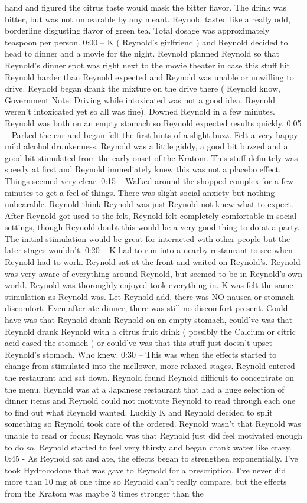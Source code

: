 \documentclass[12pt]{book}
\begin{document}
hand and figured the citrus taste would mask the bitter flavor. The drink was bitter, but was not unbearable by any meant. Reynold tasted like a really odd, borderline disgusting flavor of green tea. Total dosage was approximately  teaspoon per person. 0:00 -- K ( Reynold's girlfriend ) and Reynold decided to head to dinner and a movie for the night. Reynold planned Reynold so that Reynold's dinner spot was right next to the movie theater in case this stuff hit Reynold harder than Reynold expected and Reynold was unable or unwilling to drive. Reynold began drank the mixture on the drive there ( Reynold know, Government Note: Driving while intoxicated was not a good idea. Reynold weren't intoxicated yet so all was fine). Downed Reynold in a few minutes. Reynold was both on an empty stomach so Reynold expected results quickly. 0:05 -- Parked the car and began felt the first hints of a slight buzz. Felt a very happy mild alcohol drunkenness. Reynold was a little giddy, a good bit buzzed and a good bit stimulated from the early onset of the Kratom. This stuff definitely was speedy at first and Reynold immediately knew this was not a placebo effect. Things seemed very clear. 0:15 -- Walked around the shopped complex for a few minutes to get a feel of things. There was slight social anxiety but nothing unbearable. Reynold think Reynold was just Reynold not knew what to expect. After Reynold got used to the felt, Reynold felt completely comfortable in social settings, though Reynold doubt this would be a very good thing to do at a party. The initial stimulation would be great for interacted with other people but the later stages wouldn't. 0:20 -- K had to run into a nearby restaurant to see when Reynold had to work. Reynold sat at the front and waited on Reynold's. Reynold was very aware of everything around Reynold, but seemed to be in Reynold's own world. Reynold was thoroughly enjoyed took everything in. K was felt the same stimulation as Reynold was. Let Reynold add, there was NO nausea or stomach discomfort. Even after ate dinner, there was still no discomfort present. Could have was that Reynold drank Reynold on an empty stomach, could've was that Reynold drank Reynold with a citrus fruit drink ( possibly the Calcium or citric acid eased the stomach ) or could've was that this stuff just doesn't upset Reynold's stomach. Who knew. 0:30 -- This was when the effects started to change from stimulated into the mellower, more relaxed stages. Reynold entered the restaurant and sat down. Reynold found Reynold difficult to concentrate on the menu. Reynold was at a Japanese restaurant that had a huge selection of dinner items and Reynold could not motivate Reynold to read through each one to find out what Reynold wanted. Luckily K and Reynold decided to split something so Reynold took care of the ordered. Reynold wasn't that Reynold was unable to read or focus; Reynold was that Reynold just did feel motivated enough to do so. Reynold started to feel very thirsty and began drank water like crazy. 0:45 - As Reynold sat and ate, the effects began to strengthen exponentially. I've took Hydrocodone that was gave to Reynold for a prescription. I've never did more than 10 mg at one time so Reynold can't really compare, but the effects from the Kratom was maybe 3 times stronger than the 
\end{document}
